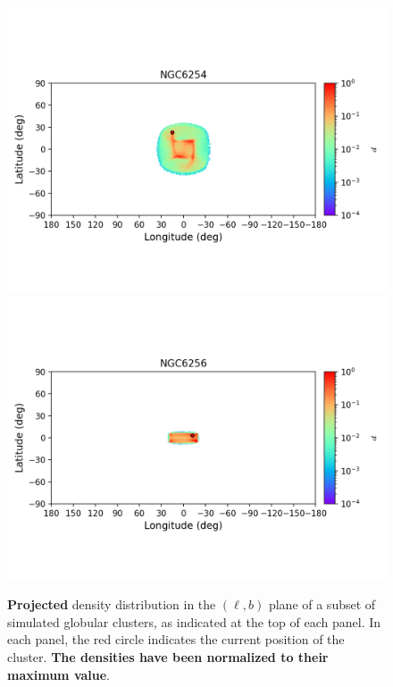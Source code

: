 \begin{figure}
        \includegraphics[clip=true, trim = 0mm 20mm 0mm 10mm, width=1\columnwidth]{images/error_plots_NGC6254.png}
        \includegraphics[clip=true, trim = 0mm 20mm 0mm 10mm, width=1\columnwidth]{images/error_plots_NGC6256.png}
        \caption[]{\textbf{Projected} density distribution in the $(\ell, b)$ plane of a subset of simulated globular clusters, as indicated at the top of each panel. In each panel, the red circle indicates the current position of the cluster. \textbf{The densities have been normalized to their maximum value}.}\label{stream8}
        \end{figure}
